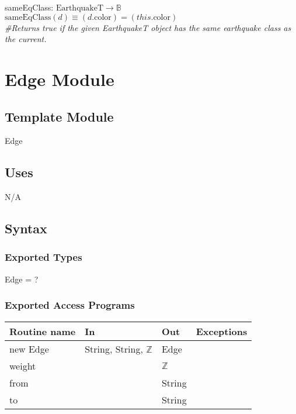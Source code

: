 \documentclass[12pt]{article}
\begin{document}
\noindent sameEqClass: $\mbox{EarthquakeT} \rightarrow \mathbb{B}$\\
$\mbox{sameEqClass}(d) \equiv (d.\mbox{color}) = (this.\mbox{color})$\\
\noindent \textit{\#Returns true if the given EarthquakeT object has the same earthquake class as the current.}\\




\newpage

\section* {Edge Module}

\subsection* {Template Module}

Edge

\subsection* {Uses}

N/A

\subsection* {Syntax}

\subsubsection* {Exported Types}

Edge = ?


\subsubsection* {Exported Access Programs}

\begin{tabular}{| l | l | l | p{6cm} |}
\hline
\textbf{Routine name} & \textbf{In} & \textbf{Out} & \textbf{Exceptions}\\
\hline
new Edge & String, String, $\mathbb{Z}$ & Edge & \\
\hline
weight & ~ & $\mathbb{Z}$ & \\
\hline
from & ~ & String & \\
\hline
to & ~ & String & \\
\hline
\end{tabular}
\end{document}
